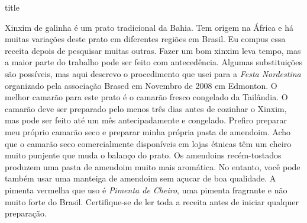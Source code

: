 \documentclass [11pt, letterpaper] {article}
\begin{document}
 {title}

Xinxim de galinha é um prato tradicional da Bahia. Tem origem na África
e há muitas variações deste prato em diferentes regiões em
Brasil. Eu compus essa receita depois de pesquisar muitas outras. Fazer
um bom xinxim leva tempo, mas a maior parte do trabalho pode ser feito com
anteced\^encia. Algumas substituições são possíveis, mas aqui descrevo o
procedimento que usei para a {\em Festa Nordestina} organizado pela associa\c{c}\~ao
Brased em Novembro de 2008 em Edmonton. O melhor camarão para este prato é o camar\~ao fresco
congelado da Tailândia. O camarão deve ser preparado pelo menos três
dias antes de cozinhar o Xinxim, mas pode ser feito até um mês
antecipadamente e congelado. Prefiro preparar meu próprio camarão seco e
preparar minha própria pasta de amendoim. Acho que o camarão seco
comercialmente disponíveis em lojas étnicas têm um cheiro muito punjente que
muda o balan\c{c}o do prato. Os amendoins recém-tostados produzem uma
pasta de amendoim muito mais aromática. No entanto, você pode tamb\'em usar uma manteiga de amendoim sem a\c{c}ucar de boa qualidade. A pimenta vermelha que uso é
{\em Pimenta de Cheiro}, uma pimenta fragrante e não muito forte do
Brasil. Certifique-se de ler toda a receita antes de iniciar qualquer
preparação.
\end{document}
